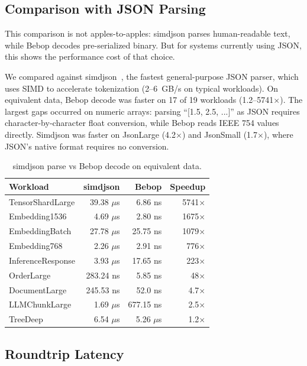\documentclass[11pt,onecolumn]{article}
\begin{document}
\subsection{Comparison with JSON Parsing}

This comparison is not apples-to-apples: simdjson parses human-readable text, while Bebop decodes pre-serialized binary. But for systems currently using JSON, this shows the performance cost of that choice.

We compared against simdjson~\cite{simdjson}, the fastest general-purpose JSON parser, which uses SIMD to accelerate tokenization (2--6~GB/s on typical workloads). On equivalent data, Bebop decode was faster on 17 of 19 workloads (1.2--5741$\times$). The largest gaps occurred on numeric arrays: parsing ``[1.5, 2.5, ...]'' as JSON requires character-by-character float conversion, while Bebop reads IEEE 754 values directly. Simdjson was faster on JsonLarge (4.2$\times$) and JsonSmall (1.7$\times$), where JSON's native format requires no conversion.

\begin{table}[ht]
\centering
\begin{tabular}{@{}lrrr@{}}
\toprule
\textbf{Workload} & \textbf{simdjson} & \textbf{Bebop} & \textbf{Speedup} \\
\midrule
TensorShardLarge & 39.38 $\mu$s & 6.86 ns & 5741$\times$ \\
Embedding1536 & 4.69 $\mu$s & 2.80 ns & 1675$\times$ \\
EmbeddingBatch & 27.78 $\mu$s & 25.75 ns & 1079$\times$ \\
Embedding768 & 2.26 $\mu$s & 2.91 ns & 776$\times$ \\
InferenceResponse & 3.93 $\mu$s & 17.65 ns & 223$\times$ \\
OrderLarge & 283.24 ns & 5.85 ns & 48$\times$ \\
DocumentLarge & 245.53 ns & 52.0 ns & 4.7$\times$ \\
LLMChunkLarge & 1.69 $\mu$s & 677.15 ns & 2.5$\times$ \\
TreeDeep & 6.54 $\mu$s & 5.26 $\mu$s & 1.2$\times$ \\
\bottomrule
\end{tabular}
\caption{simdjson parse vs Bebop decode on equivalent data.}
\label{tab:simdjson}
\end{table}

\subsection{Roundtrip Latency}
\end{document}
